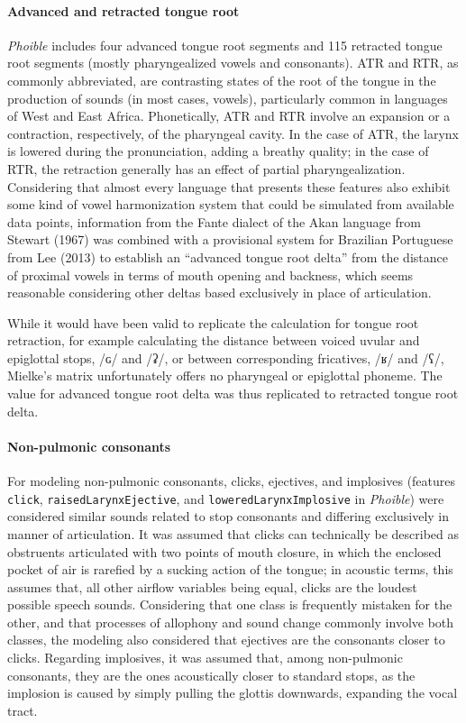 \documentclass[a4paper]{article}
\begin{document}
\paragraph{Advanced and retracted tongue
root}\label{advanced-and-retracted-tongue-root}

\emph{Phoible} includes four advanced tongue root segments and 115 retracted tongue root segments (mostly pharyngealized
vowels and consonants). ATR and RTR, as commonly abbreviated, are
contrasting states of the root of the tongue in the production of sounds
(in most cases, vowels), particularly common in languages of West and
East Africa. Phonetically, ATR and RTR involve an expansion or a
contraction, respectively, of the pharyngeal cavity. In the case of ATR,
the larynx is lowered during the pronunciation, adding a breathy
quality; in the case of RTR, the retraction generally has an effect of
partial pharyngealization. Considering that almost every language that
presents these features also exhibit some kind of vowel harmonization
system that could be simulated from available data points, information
from the Fante dialect of the Akan language from Stewart (1967) was
combined with a provisional system for Brazilian Portuguese from Lee
(2013) to establish an ``advanced tongue root delta'' from the distance
of proximal vowels in terms of mouth opening and backness, which seems
reasonable considering other deltas based exclusively in place of
articulation.

While it would have been valid to replicate the calculation for tongue
root retraction, for example calculating the distance between voiced
uvular and epiglottal stops, /\textscg{}ɢ/ and /\textbarglotstop{}ʡ/, or between corresponding
fricatives, /\textinvscr{}ʁ/ and /ʕ/, Mielke's matrix unfortunately offers no
pharyngeal or epiglottal phoneme. The value for advanced tongue root
delta was thus replicated to retracted tongue root delta.

\paragraph{Non-pulmonic consonants}\label{non-pulmonic-consonants}

For modeling non-pulmonic consonants, clicks, ejectives, and implosives
(features \texttt{click}, \texttt{raisedLarynxEjective}, and
\texttt{lowered\-Larynx\-Implosive} in \emph{Phoible}) were considered
similar sounds related to stop consonants and differing exclusively in
manner of articulation. It was assumed that clicks can technically be
described as obstruents articulated with two points of mouth closure, in
which the enclosed pocket of air is rarefied by a sucking action of the
tongue; in acoustic terms, this assumes that, all other airflow
variables being equal, clicks are the loudest possible speech sounds.
Considering that one class is frequently mistaken for the other, and
that processes of allophony and sound change commonly involve both
classes, the modeling also considered that ejectives are the consonants
closer to clicks. Regarding implosives, it was assumed that, among
non-pulmonic consonants, they are the ones acoustically closer to
standard stops, as the implosion is caused by simply pulling the glottis
downwards, expanding the vocal tract.
\end{document}
